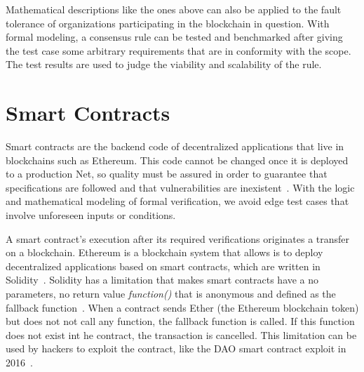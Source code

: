 \documentclass[sigconf, nonacm]{acmart}
\begin{document}
Mathematical descriptions like the ones above can also be applied to the fault tolerance of organizations participating in the blockchain in question.
With formal modeling, a consensus rule can be tested and benchmarked after giving the test case some arbitrary requirements that are in conformity with the scope.
The test results are used to judge the viability and scalability of the rule. 

\section{Smart Contracts}\label{smartContracts}
Smart contracts are the backend code of decentralized applications that live in blockchains such as Ethereum. 
This code cannot be changed once it is deployed to a production Net, so quality must be assured in order to guarantee
that specifications are followed and that vulnerabilities are inexistent~\cite{Murray2019}.
With the logic and mathematical modeling of formal verification, we avoid edge test cases that involve unforeseen inputs or conditions.

A smart contract's execution after its required verifications originates a transfer on a blockchain. Ethereum is a blockchain system
that allows is to deploy decentralized applications based on smart contracts, which are written in Solidity~\cite{Murray2019}.
Solidity has a limitation that makes smart contracts have a no parameters, no return value \textit{function()} that is anonymous
and defined as the fallback function~\cite{Liu2019}. When a contract sends Ether (the Ethereum blockchain token) but does not
not call any function, the fallback function is called. If this function does not exist int he contract, the transaction is cancelled.
This limitation can be used by hackers to exploit the contract, like the DAO smart contract exploit in 2016~\cite{Liu2019}.
\end{document}
